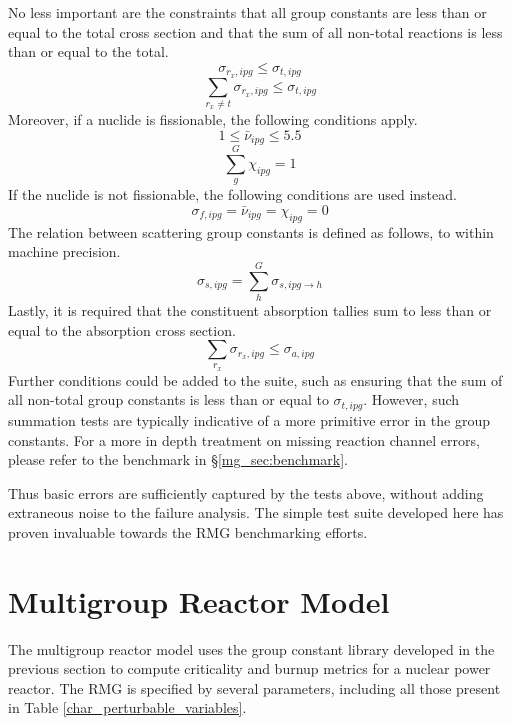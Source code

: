 No less important are the constraints that all group constants are less than or equal to 
the total cross section and that the sum of all non-total reactions is less than or equal
to the total.
\begin{equation}
\label{tot_xs_ut}
\sigma_{r_x,ipg} \le \sigma_{t,ipg}
\end{equation}
\begin{equation}
\label{tot_xs_sum}
\sum_{r_x \ne t}\sigma_{r_x,ipg} \le \sigma_{t,ipg}
\end{equation}
Moreover, if a nuclide is fissionable, the following conditions apply.
\begin{equation}
\label{nu_fiss_ut}
1 \le \bar{\nu}_{ipg} \le 5.5
\end{equation}
\begin{equation}
\label{chi_fiss_ut}
\sum_g^G \chi_{ipg} = 1
\end{equation}
If the nuclide is not fissionable, the following conditions are used instead.
\begin{equation}
\label{not_fiss_ut}
\sigma_{f,ipg} = \bar{\nu}_{ipg} = \chi_{ipg} = 0
\end{equation}
The relation between scattering group constants is defined as follows, to 
within machine precision.
\begin{equation}
\label{scat_xs_ut}
\sigma_{s,ipg} = \sum_h^G \sigma_{s,ipg\to h}
\end{equation}
Lastly, it is required that the constituent absorption tallies sum 
to less than or equal to the absorption cross section.
\begin{equation}
\label{scat_xs_ut}
\sum_{r_x} \sigma_{r_x,ipg} \le \sigma_{a,ipg}
\end{equation}
Further conditions could be added to the suite, such as ensuring that the sum of 
all non-total group constants is less than or equal to $\sigma_{t,ipg}$.  However, 
such summation tests are typically indicative of a more primitive error in the 
group constants.  
For a more in depth treatment on missing reaction channel errors, please refer to the 
benchmark in \S \ref{mg_sec:benchmark}.

Thus basic errors are sufficiently captured by the tests above, 
without adding extraneous noise to the failure analysis.  The simple test suite developed
here has proven invaluable towards the RMG benchmarking efforts.




\section{Multigroup Reactor Model}
\label{mg_sec:rmg_model}
The multigroup reactor model uses the group constant library developed in the previous 
section to compute criticality and burnup metrics for a nuclear power reactor.
The RMG is specified by several parameters, including all those present in Table
\ref{char_perturbable_variables}.

